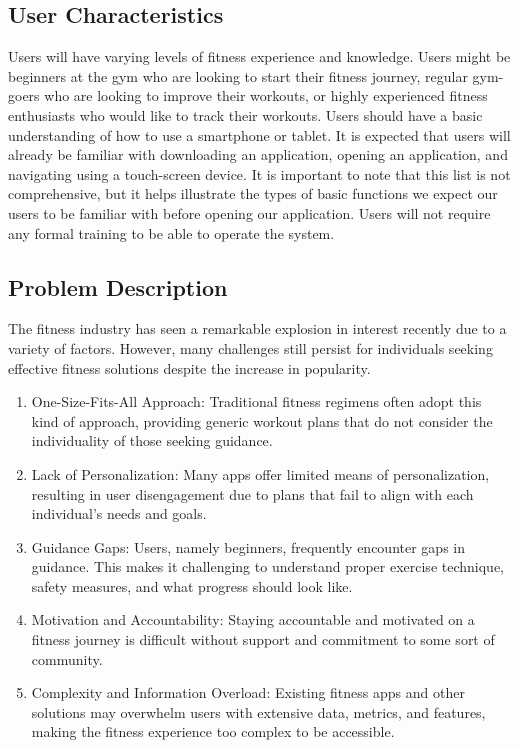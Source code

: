 \documentclass[12pt]{article}
\begin{document}
\subsection{User Characteristics}
Users will have varying levels of fitness experience and knowledge. Users might be beginners at the gym who are looking to start their fitness journey, regular gym-goers who are looking to improve their workouts, or highly experienced fitness enthusiasts who would like to track their workouts. Users should have a basic understanding of how to use a smartphone or tablet. It is expected that users will already be familiar with downloading an application, opening an application, and navigating using a touch-screen device. It is important to note that this list is not comprehensive, but it helps illustrate the types of basic functions we expect our users to be familiar with before opening our application. Users will not require any formal training to be able to operate the system.

\subsection{Problem Description}
The fitness industry has seen a remarkable explosion in interest recently due to a variety of factors. However, many challenges still persist for individuals seeking effective fitness solutions despite the increase in popularity.

\begin{enumerate}
  \item One-Size-Fits-All Approach: Traditional fitness regimens often adopt this kind of approach, providing generic workout plans that do not consider the individuality of those seeking guidance.
  \item Lack of Personalization: Many apps offer limited means of personalization, resulting in user disengagement due to plans that fail to align with each individual’s needs and goals.
  \item Guidance Gaps: Users, namely beginners, frequently encounter gaps in guidance. This makes it challenging to understand proper exercise technique, safety measures, and what progress should look like.
  \item Motivation and Accountability: Staying accountable and motivated on a fitness journey is difficult without support and commitment to some sort of community.
  \item Complexity and Information Overload: Existing fitness apps and other solutions may overwhelm users with extensive data, metrics, and features, making the fitness experience too complex to be accessible.
\end{enumerate}
\end{document}
